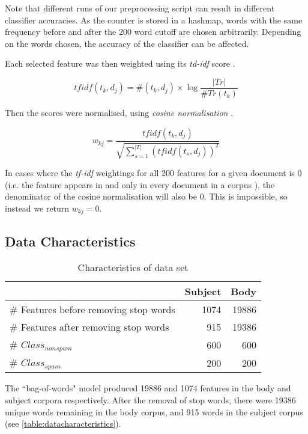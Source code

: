 \documentclass[10pt, a4paper]{article}
\begin{document}
Note that different runs of our preprocessing script can result in different classifier accuracies. As the counter is stored in a hashmap, words with the same frequency before and after the 200 word cutoff are chosen arbitrarily. Depending on the words chosen, the accuracy of the classifier can be affected.

Each selected feature was then weighted using its \emph{td-idf} score \cite{sebastiani}.

$$ tfidf(t_k, d_j) = \#(t_k, d_j) \times \log \frac{|Tr|}{\#Tr(t_k)} $$

Then the scores were normalised, using \emph{cosine normalisation} \cite{sebastiani}.

$$ w_{kj} = \frac{tfidf(t_k, d_j)}{\sqrt{\sum_{s=1}^{|T|} (tfidf(t_s, d_j))^2 }} $$

In cases where the \textit{tf-idf} weightings for all 200 features for a given document is 0 (i.e. the feature appears in and only in every document in a corpus ), the denominator of the cosine normalisation will also be 0. This is impossible, so instead we return $w_{kj} = 0$.

\subsection{Data Characteristics}

\setlength\extrarowheight{3pt}

\begin{table}[H]
\centering
\caption{Characteristics of data set}
\begin{tabular}{@{}lrr@{}}
\toprule
& \textbf{Subject} & \textbf{Body} \\
\midrule
\# Features before removing stop words & 1074 & 19886 \\
\# Features after removing stop words & 915 & 19386 \\
\# $Class_{nonspam}$ & 600 & 600 \\
\# $Class_{spam}$ & 200 & 200 \\
\bottomrule
\end{tabular}
\label{table:datacharacteristics}
\end{table}

The ``bag-of-words" model produced 19886 and 1074 features in the body and subject corpora respectively. After the removal of stop words, there were 19386 unique words remaining in the body corpus, and 915 words in the subject corpus (see \autoref{table:datacharacteristics}).
\end{document}
